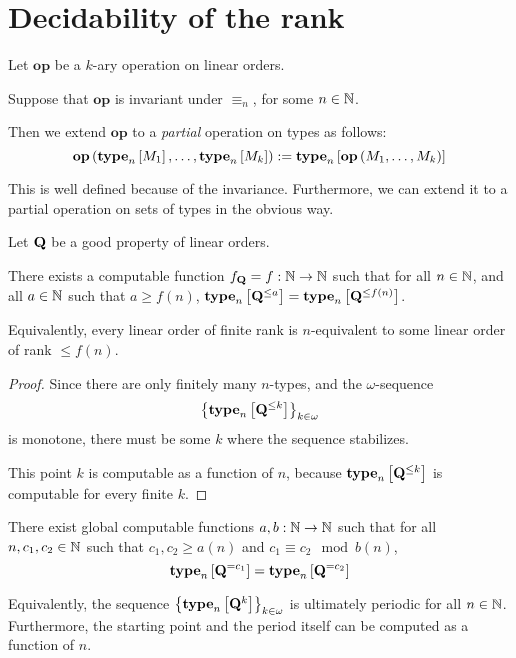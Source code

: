
\section{Decidability of the rank}

\begin{definition}
  Let $\mathbf{op}$ be a $k$-ary operation on linear orders.

  Suppose that $\mathbf{op}$ is invariant under $\equiv_n$, for some $n \in \mathbb{N}$.

  Then we extend $\mathbf{op}$ to a \emph{partial} operation on types as follows:
  \[
    \mathbf{op} \left( {\mathbf{type}_{n} \left[ {M_1} \right], \ldots, \mathbf{type}_{n} \left[ {M_k} \right]} \right)
    := \mathbf{type}_{n} \left[ {\mathbf{op} \left( {M_1, \ldots, M_k} \right)} \right]
  \]

  This is well defined because of the invariance. Furthermore, we can
  extend it to a partial operation on sets of types in the obvious way.
\end{definition}

\begin{lemma}
  Let $\mathbf{Q}$ be a good property of linear orders.

  There exists a computable function $f_{\mathbf{Q}} = f: \mathbb{N} \to \mathbb{N}$ such that
  for all $n \in \mathbb{N}$, and all $a \in \mathbb{N}$ such that $a \ge f(n)$,
  $\mathbf{type}_{n} \left[ {\mathbf{Q}^{\le a}} \right] = \mathbf{type}_{n} \left[ {\mathbf{Q}^{\le f(n)}} \right]$.

  Equivalently, every linear order of finite rank is $n$-equivalent to some linear order of rank $\le f(n)$.
\end{lemma}

\begin{proof}
  Since there are only finitely many $n$-types,
  and the $\omega$-sequence \[\left\{ {\mathbf{type}_{n} \left[ {\mathbf{Q}^{\le k}} \right]} \right\}_{k \in \omega}\]
  is monotone,
  there must be some $k$ where the sequence stabilizes.

  This point $k$ is computable as a function of $n$, because
  $\mathbf{type}_{n} \left[ {\mathbf{Q}^{\le k}} \right]$ is computable for every finite $k$.
\end{proof}

\begin{lemma}
  There exist global computable functions $a, b : \mathbb{N} \to \mathbb{N}$ such that
  for all $n, c_1, c_2 \in \mathbb{N}$ such that $c_1, c_2 \ge a(n)$ and $c_1 \equiv c_2 \mod b(n)$,
  \[\mathbf{type}_{n} \left[ {\mathbf{Q}^{= c_1}} \right] = \mathbf{type}_{n} \left[ {\mathbf{Q}^{= c_2}} \right]\]

  Equivalently, the sequence $\left\{ {\mathbf{type}_{n} \left[ {\mathbf{Q}^{k}} \right]} \right\}_{k \in \omega}$
  is ultimately periodic for all $n \in \mathbb{N}$. Furthermore, the starting point and the period
  itself can be computed as a function of $n$.
\end{lemma}

